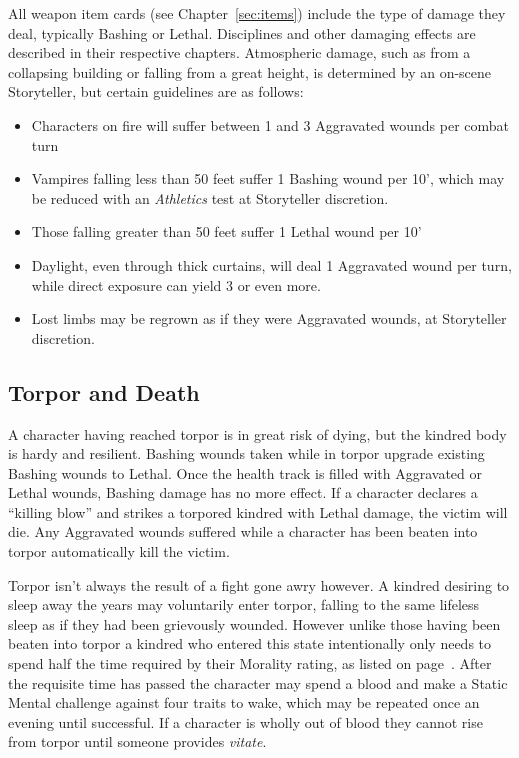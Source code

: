All weapon item cards (see Chapter~\ref{sec:items}) include the type of damage they deal, 
typically Bashing or Lethal.  Disciplines and other damaging effects are described in their 
respective chapters.  Atmospheric damage, such as from a collapsing building or falling from 
a great height, is determined by an on-scene Storyteller, but certain guidelines are as follows:  \\

\begin{itemize}
	\item Characters on fire will suffer between 1 and 3 Aggravated wounds per combat turn
	\item Vampires falling less than 50 feet suffer 1 Bashing wound per 10', which may be reduced 
	with an \emph{Athletics} test at Storyteller discretion.
	\item Those falling greater than 50 feet suffer 1 Lethal wound per 10'
	\item Daylight, even through thick curtains, will deal 1 Aggravated wound per turn, while 
	direct exposure can yield 3 or even more.
	\item Lost limbs may be regrown as if they were Aggravated wounds, at Storyteller discretion.
\end{itemize}

\subsection{Torpor and Death}
A character having reached torpor is in great risk of dying, but the kindred 
body is hardy and resilient.  Bashing wounds taken while in torpor upgrade 
existing Bashing wounds to Lethal.  Once the health track is filled 
with Aggravated or Lethal wounds, Bashing damage has no more effect.  
If a character declares a ``killing blow'' and strikes a torpored 
kindred with Lethal damage, the victim will die.  Any Aggravated wounds 
suffered while a character has been beaten into torpor automatically kill 
the victim.

Torpor isn't always the result of a fight gone awry however.  A kindred desiring 
to sleep away the years may voluntarily enter torpor, falling to the same 
lifeless sleep as if they had been grievously wounded.  However unlike those 
having been beaten into torpor a kindred who entered this state intentionally 
only needs to spend half the time required by their Morality rating, as listed on 
page~\pageref{sec:health}.  After the requisite time has passed the character 
may spend a blood and make a Static Mental challenge against four traits to wake, 
which may be repeated once an evening until successful.  If a character is wholly 
out of blood they cannot rise from torpor until someone provides \emph{vitate}.

